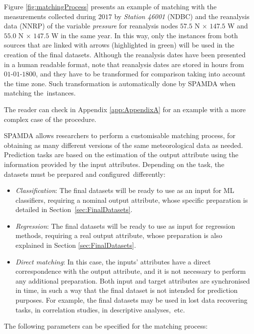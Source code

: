 \documentclass[energies,article,accept,moreauthors,pdftex]{Definitions/mdpi}
\begin{document}
\begin{paracol}{2}
				Figure \ref{fig:matchingProcess} presents an example of matching with the measurements collected during $2017$ by \textit{Station 46001} (NDBC) and the reanalysis data (NNRP) of the variable \textit{pressure} for reanalysis nodes $57.5$ N $\times$ $147.5$ W and $55.0$ N $\times$ $147.5$ W in the same year. In this way, only the instances from both sources that are linked with arrows (highlighted in green) will be used in the creation of the final datasets. Although the reanalysis dates have been presented in a human readable format, note that reanalysis dates are stored in hours from $01$-$01$-$1800$, and they have to be transformed for comparison taking into account the time zone. Such transformation is automatically done by SPAMDA when matching the~instances.
				
				The reader can check in Appendix \ref{app:AppendixA} for an example with a more complex case of the procedure.
				
				
				SPAMDA allows researchers to perform a customisable matching process, for obtaining as many different versions of the same meteorological data as needed.
				Prediction tasks are based on the estimation of the output attribute using the information provided by the input attributes. Depending on the task, the datasets must be prepared and \mbox{configured~differently}:
				\begin{itemize}
					\item \textit{Classification}: The final datasets will be ready to use as an input for ML classifiers, requiring a nominal output attribute, whose specific preparation is detailed in \mbox{Section \ref{sec:FinalDatasets}}.
					\item \textit{Regression}: The final datasets will be ready to use as input for regression methods, requiring a real output attribute, whose preparation is also explained in Section \ref{sec:FinalDatasets}.
					\item \textit{Direct matching}: In this case, the inputs' attributes have a direct correspondence with the output attribute, and it is not necessary to perform any additional preparation. Both input and target attributes are synchronised in time, in such a way that the final dataset is not intended for prediction purposes. For example, the final datasets may be used in lost data recovering tasks, in correlation studies, in descriptive \mbox{analyses, etc}.
				\end{itemize}
				
				The following parameters can be specified for the matching process:
				\begin{itemize}
				

\end{itemize}
\end{paracol}
\end{document}
